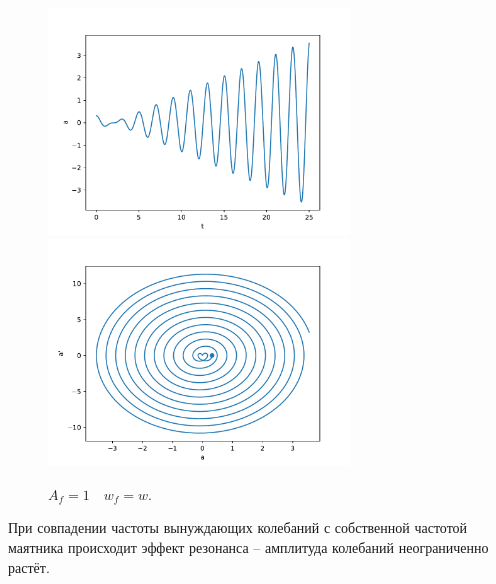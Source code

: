             \begin{figure}[H]
                \centering
                \includegraphics[width=8cm]{pictures/4resonance3.pdf}
                \includegraphics[width=8cm]{pictures/4resonance3p.pdf}
                \caption{$A_f = 1 \quad w_f = w$.}
            \end{figure}
            При совпадении частоты вынуждающих колебаний с собственной частотой маятника происходит эффект резонанса -- амплитуда колебаний неограниченно растёт.


